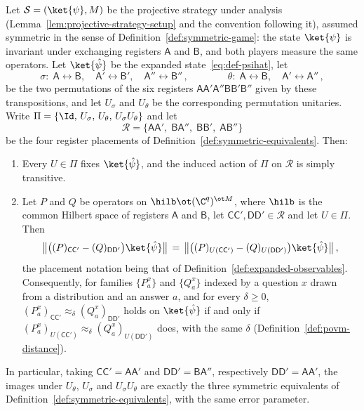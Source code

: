 \begin{lemma}
	\label{lem:symmetric-equivalents-transfer}
	\notready
	Let $\mathcal{S} = (\ket{\psi}, M)$ be the projective strategy under
	analysis (Lemma~\ref{lem:projective-strategy-setup} and the convention
	following it), assumed symmetric in the sense of
	Definition~\ref{def:symmetric-game}: the state $\ket{\psi}$ is
	invariant under exchanging registers $\mathsf{A}$ and $\mathsf{B}$, and
	both players measure the same operators. Let $\ket{\hat{\psi}}$ be the
	expanded state~\eqref{eq:def-psihat}, let
	\[
		\sigma \colon\;
		\mathsf{A} \leftrightarrow \mathsf{B},\quad
		\mathsf{A}' \leftrightarrow \mathsf{B}',\quad
		\mathsf{A}'' \leftrightarrow \mathsf{B}''\,,
		\qquad\qquad
		\theta \colon\;
		\mathsf{A} \leftrightarrow \mathsf{B},\quad
		\mathsf{A}' \leftrightarrow \mathsf{A}''\,,
	\]
	be the two permutations of the six registers
	$\mathsf{A}\mathsf{A}'\mathsf{A}''\mathsf{B}\mathsf{B}'\mathsf{B}''$
	given by these transpositions, and let $U_\sigma$ and $U_\theta$ be the
	corresponding permutation unitaries. Write
	$\Pi = \{\Id,\, U_\sigma,\, U_\theta,\, U_\sigma U_\theta\}$ and let
	\[
		\mathcal{R} = \{\mathsf{A}\mathsf{A}',\; \mathsf{B}\mathsf{A}'',\;
		\mathsf{B}\mathsf{B}',\; \mathsf{A}\mathsf{B}''\}
	\]
	be the four register placements of
	Definition~\ref{def:symmetric-equivalents}. Then:
	\begin{enumerate}
		\item Every $U \in \Pi$ fixes $\ket{\hat{\psi}}$, and the induced
		action of $\Pi$ on $\mathcal{R}$ is simply transitive.
		\item Let $P$ and $Q$ be operators on
		$\hilb \ot (\C^q)^{\ot M}$, where $\hilb$ is the common Hilbert
		space of registers $\mathsf{A}$ and $\mathsf{B}$, let
		$\mathsf{C}\mathsf{C}', \mathsf{D}\mathsf{D}' \in \mathcal{R}$ and
		let $U \in \Pi$. Then
		\[
			\bigl\| \bigl( (P)_{\mathsf{C}\mathsf{C}'} - (Q)_{\mathsf{D}\mathsf{D}'} \bigr) \ket{\hat{\psi}} \bigr\|
			\,=\,
			\bigl\| \bigl( (P)_{U(\mathsf{C}\mathsf{C}')} - (Q)_{U(\mathsf{D}\mathsf{D}')} \bigr) \ket{\hat{\psi}} \bigr\|\,,
		\]
		the placement notation being that of
		Definition~\ref{def:expanded-observables}. Consequently, for
		families $\{P^x_a\}$ and $\{Q^x_a\}$ indexed by a question $x$ drawn
		from a distribution and an answer $a$, and for every $\delta \ge 0$,
		$(P^x_a)_{\mathsf{C}\mathsf{C}'} \approx_\delta (Q^x_a)_{\mathsf{D}\mathsf{D}'}$
		holds on $\ket{\hat{\psi}}$ if and only if
		$(P^x_a)_{U(\mathsf{C}\mathsf{C}')} \approx_\delta (Q^x_a)_{U(\mathsf{D}\mathsf{D}')}$
		does, with the same $\delta$
		(Definition~\ref{def:povm-distance}).
	\end{enumerate}
	In particular, taking $\mathsf{C}\mathsf{C}' = \mathsf{A}\mathsf{A}'$
	and $\mathsf{D}\mathsf{D}' = \mathsf{B}\mathsf{A}''$, respectively
	$\mathsf{D}\mathsf{D}' = \mathsf{A}\mathsf{A}'$, the images under
	$U_\theta$, $U_\sigma$ and $U_\sigma U_\theta$ are exactly the three
	symmetric equivalents of Definition~\ref{def:symmetric-equivalents},
	with the same error parameter.
\end{lemma}
